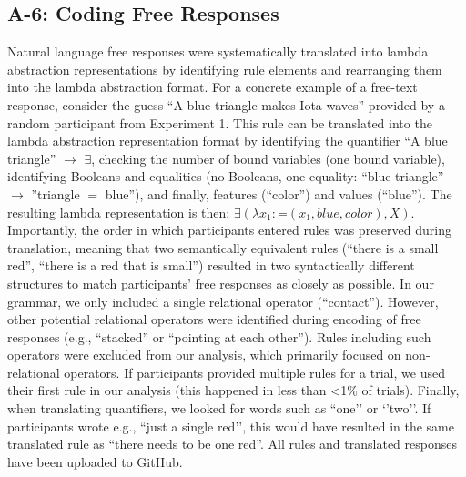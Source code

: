 \documentclass[doc,natbib,floatsintext]{apa7}
\begin{document}
\begin{appendices}
\subsection{A-6: Coding Free Responses}\label{ap:a6_free_response_coding}
Natural language free responses were systematically translated into lambda abstraction representations by identifying rule elements and rearranging them into the lambda abstraction format. For a concrete example of a free-text response, consider the guess ``A blue triangle makes Iota waves'' provided by a random participant from Experiment 1. This rule can be translated into the lambda abstraction representation format by identifying the quantifier ``A blue triangle'' \(\rightarrow\) \(\exists\), checking the number of bound variables (one bound variable), identifying  Booleans and equalities (no Booleans, one equality: ``blue triangle'' \(\rightarrow\) ''triangle \(=\) blue''), and finally, features (``color'') and values (``blue''). The resulting lambda representation is then: \(\exists(\lambda x_{1}: \text{=}(x_{1},blue,color), X)\). Importantly, the order in which participants entered rules was preserved during translation, meaning that two semantically equivalent rules (``there is a small red'', ``there is a red that is small'') resulted in two syntactically different structures to match participants' free responses as closely as possible. In our grammar, we only included a single relational operator (``contact''). However, other potential relational operators were identified during encoding of free responses (e.g., ``stacked'' or ``pointing at each other''). Rules including such operators were excluded from our analysis, which primarily focused on non-relational operators. If participants provided multiple rules for a trial, we used their first rule in our analysis (this happened in less than <1\% of trials). Finally, when translating quantifiers, we looked for words such as ``one’’ or ‘’two’’. If participants wrote e.g., ``just a single red’’, this would have resulted in the same translated rule as ``there needs to be one red''. All rules and translated responses have been uploaded to GitHub.



\end{appendices}
\end{document}
